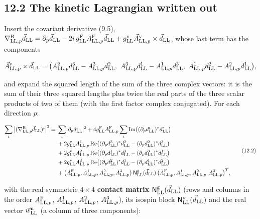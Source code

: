 \documentclass[
  10pt,
]{article}
\begin{document}
\hypertarget{the-kinetic-lagrangian-written-out}{%
\subsection{12.2 The kinetic Lagrangian written
out}\label{the-kinetic-lagrangian-written-out}}

Insert the covariant derivative (9.5),
\(\nabla^{\rm B}_{{\rm LL},p}\vec d_{\rm LL}=\partial_p\vec d_{\rm LL}-2i\,g^{\rm F}_{\rm LL}A^{\rm F}_{{\rm LL},p}\vec d_{\rm LL}+g^{\rm v}_{\rm LL}\vec A^{\rm v}_{{\rm LL},p}\times\vec d_{\rm LL}\),
whose last term has the components

\[\vec A^{\rm v}_{{\rm LL},p}\times\vec d_{\rm LL}=\big(A^2_{{\rm LL},p}d^3_{\rm LL}-A^3_{{\rm LL},p}d^2_{\rm LL},\ A^3_{{\rm LL},p}d^1_{\rm LL}-A^1_{{\rm LL},p}d^3_{\rm LL},\ A^1_{{\rm LL},p}d^2_{\rm LL}-A^2_{{\rm LL},p}d^1_{\rm LL}\big),\]

and expand the squared length of the sum of the three complex vectors:
it is the sum of their three squared lengths plus twice the real parts
of the three scalar products of two of them (with the first factor
complex conjugated). For each direction \(p\):

\[\begin{aligned}\sum_\iota\big\lvert(\nabla^{\rm B}_{{\rm LL},p}\vec d_{\rm LL})^\iota\big\rvert^2={}&\sum_\iota\lvert\partial_pd^\iota_{\rm LL}\rvert^2+4g^{\rm F}_{\rm LL}A^{\rm F}_{{\rm LL},p}\sum_\iota{\rm Im}\big((\partial_pd^\iota_{\rm LL})^*d^\iota_{\rm LL}\big)\\&+2g^{\rm v}_{\rm LL}A^1_{{\rm LL},p}\,{\rm Re}\big((\partial_pd^3_{\rm LL})^*d^2_{\rm LL}-(\partial_pd^2_{\rm LL})^*d^3_{\rm LL}\big)\\&+2g^{\rm v}_{\rm LL}A^2_{{\rm LL},p}\,{\rm Re}\big((\partial_pd^1_{\rm LL})^*d^3_{\rm LL}-(\partial_pd^3_{\rm LL})^*d^1_{\rm LL}\big)\\&+2g^{\rm v}_{\rm LL}A^3_{{\rm LL},p}\,{\rm Re}\big((\partial_pd^2_{\rm LL})^*d^1_{\rm LL}-(\partial_pd^1_{\rm LL})^*d^2_{\rm LL}\big)\\&+\big(A^{\rm F}_{{\rm LL},p},A^1_{{\rm LL},p},A^2_{{\rm LL},p},A^3_{{\rm LL},p}\big)\,\mathsf N^{\rm g}_{\rm LL}(\vec d_{\rm LL})\,\big(A^{\rm F}_{{\rm LL},p},A^1_{{\rm LL},p},A^2_{{\rm LL},p},A^3_{{\rm LL},p}\big)^T,\end{aligned}\tag{12.2}\]

with the real symmetric \(4\times4\) \textbf{contact matrix}
\(\mathsf N^{\rm g}_{\rm LL}(\vec d_{\rm LL})\) (rows and columns in the
order \(A^{\rm F}_{{\rm LL},p}\), \(A^1_{{\rm LL},p}\),
\(A^2_{{\rm LL},p}\), \(A^3_{{\rm LL},p}\)), its isospin block
\(\mathsf N^{\rm v}_{\rm LL}(\vec d_{\rm LL})\) and the real vector
\(\vec w^{\rm n}_{\rm LL}\) (a column of three components):
\end{document}
